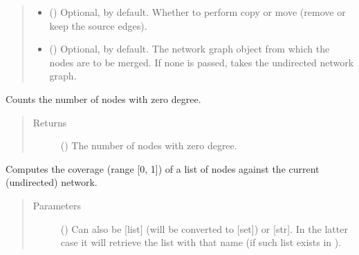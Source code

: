 \documentclass[letterpaper,10pt,english]{sphinxmanual}
\begin{document}
\begin{fulllineitems}
\begin{fulllineitems}
\begin{quote}
\begin{description}
\begin{itemize}
\item {} 
 () \textendash{} Optional,  by default. Whether to perform copy or
move (remove or keep the source edges).

\item {} 
 () \textendash{} Optional,  by default. The network graph object from
which the nodes are to be merged. If none is passed, takes
the undirected network graph.

\end{itemize}

\end{description}\end{quote}

\end{fulllineitems}


\begin{fulllineitems}
\label{\detokenize{main:pypath.main.PyPath.count_sol}}
Counts the number of nodes with zero degree.
\begin{quote}\begin{description}
\item[{Returns}] \leavevmode
() \textendash{} The number of nodes with zero degree.

\end{description}\end{quote}

\end{fulllineitems}


\begin{fulllineitems}
\label{\detokenize{main:pypath.main.PyPath.coverage}}
Computes the coverage (range {[}0, 1{]}) of a list of nodes against
the current (undirected) network.
\begin{quote}\begin{description}
\item[{Parameters}] \leavevmode
{} () \textendash{} Can also be {[}list{]} (will be converted to {[}set{]}) or {[}str{]}. In
the latter case it will retrieve the list with that name (if
such list exists in ).


\end{description}
\end{quote}
\end{fulllineitems}
\end{fulllineitems}
\end{document}
